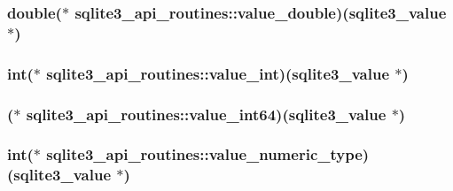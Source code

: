 \hypertarget{structsqlite3__api__routines_aa023ab267b40e50bec5ccacd32486eb8}{
\subsubsection[{value\-\_\-double}]{\setlength{\rightskip}{0pt plus 5cm}double($\ast$ sqlite3\-\_\-api\-\_\-routines\-::value\-\_\-double)({\bf sqlite3\-\_\-value} $\ast$)}}\label{structsqlite3__api__routines_aa023ab267b40e50bec5ccacd32486eb8}
\hypertarget{structsqlite3__api__routines_a31b7443c4d35480567266930a3d4e64f}{
\subsubsection[{value\-\_\-int}]{\setlength{\rightskip}{0pt plus 5cm}int($\ast$ sqlite3\-\_\-api\-\_\-routines\-::value\-\_\-int)({\bf sqlite3\-\_\-value} $\ast$)}}\label{structsqlite3__api__routines_a31b7443c4d35480567266930a3d4e64f}
\hypertarget{structsqlite3__api__routines_ae2eb08ff1ad717cf6737d657fd8a11b5}{
\subsubsection[{value\-\_\-int64}]{($\ast$ sqlite3\-\_\-api\-\_\-routines\-::value\-\_\-int64)({\bf sqlite3\-\_\-value} $\ast$)}}\label{structsqlite3__api__routines_ae2eb08ff1ad717cf6737d657fd8a11b5}
\hypertarget{structsqlite3__api__routines_a9032977e99c01fc28d3c3f054192f7cd}{
\subsubsection[{value\-\_\-numeric\-\_\-type}]{\setlength{\rightskip}{0pt plus 5cm}int($\ast$ sqlite3\-\_\-api\-\_\-routines\-::value\-\_\-numeric\-\_\-type)({\bf sqlite3\-\_\-value} $\ast$)}}\label{structsqlite3__api__routines_a9032977e99c01fc28d3c3f054192f7cd}
